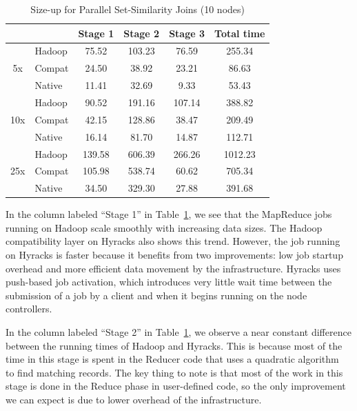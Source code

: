 \begin{table} [htb!]
\caption{Size-up for Parallel Set-Similarity Joins (10 nodes)}\label{tbl:sizeup-fuzzyjoins}
\center
\begin{tabular}{cl||c|c|c|c}
                     &        & Stage 1 & Stage 2 & Stage 3 & Total time\\
\hline\hline
\multirow{3}{*}{5x}  & Hadoop &   75.52 &  103.23 &   76.59 &  255.34 \\
                     & Compat &   24.50 &   38.92 &   23.21 &   86.63 \\
                     & Native &    11.41 &   32.69 &    9.33 &   53.43 \\
\hline
\multirow{3}{*}{10x} & Hadoop &   90.52 &  191.16 &  107.14 &  388.82 \\
                     & Compat &   42.15 &  128.86 &   38.47 &  209.49 \\
                     & Native &   16.14 &   81.70 &   14.87 &  112.71 \\
\hline
\multirow{3}{*}{25x} & Hadoop &  139.58 &  606.39 &  266.26 & 1012.23 \\
                     & Compat &  105.98 &  538.74 &   60.62 &  705.34 \\
                     & Native &   34.50 &  329.30 &   27.88 &  391.68 \\
\end{tabular}
\end{table}

In the column labeled ``Stage 1'' in Table~\ref{tbl:sizeup-fuzzyjoins}, we see that the MapReduce jobs running on Hadoop scale smoothly with increasing data sizes.
The Hadoop compatibility layer on Hyracks
also shows this trend. However, the job running on Hyracks is faster because it benefits from two improvements: low job startup overhead and more efficient data movement
by the infrastructure.
Hyracks uses push-based job activation, which introduces very little wait time between the submission of a job by a client and when it begins running on the node controllers.

In the column labeled ``Stage 2'' in Table~\ref{tbl:sizeup-fuzzyjoins}, we observe a near constant difference between the running times of Hadoop and Hyracks. This is because
most of the time in this stage is spent in the Reducer code that uses a quadratic algorithm~\cite{FuzzyJoinMR} to find matching records.
The key thing to note is that
most of
the work in this stage is done in the Reduce phase in user-defined code, so the only improvement we can expect is due to lower overhead of the infrastructure.

